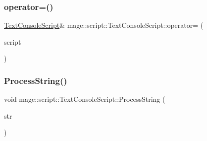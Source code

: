 \subsubsection{\texorpdfstring{operator=()}{operator=()}\hspace{0.1cm}{\footnotesize\ttfamily [2/2]}}
{\footnotesize\ttfamily \mbox{\hyperlink{classmage_1_1script_1_1_text_console_script}{Text\+Console\+Script}}\& mage\+::script\+::\+Text\+Console\+Script\+::operator= (\begin{DoxyParamCaption}\item[{\mbox{\hyperlink{classmage_1_1script_1_1_text_console_script}{Text\+Console\+Script}} \&\&}]{script }\end{DoxyParamCaption})\hspace{0.3cm}{\ttfamily [delete]}}

\mbox{\label{classmage_1_1script_1_1_text_console_script_a9c990e0256f01eb4cc1622bf346f32a5}} 
\subsubsection{\texorpdfstring{Process\+String()}{ProcessString()}}
{\footnotesize\ttfamily void mage\+::script\+::\+Text\+Console\+Script\+::\+Process\+String (\begin{DoxyParamCaption}\item[{\mbox{\hyperlink{namespacemage_a8769f9d670d6b585ea306cb1062af94b}{Not\+Null}}$<$ \mbox{\hyperlink{namespacemage_ac409e0f2a22292a3a4cd42742994fbf0}{const\+\_\+wzstring}} $>$}]{str }\end{DoxyParamCaption})\hspace{0.3cm}{\ttfamily [private]}}

\mbox{\label{classmage_1_1script_1_1_text_console_script_a18bdee79ee6f53e28f90b607c36c8188}} 
